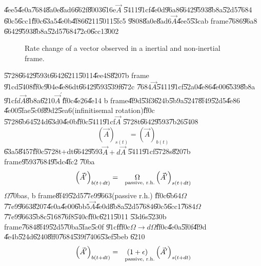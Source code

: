 \documentclass[12pt,a4paper]{article}
\begin{document}
\U{4ee5}\U{4e0a}\U{7684}\U{8a0e}\U{8ad6}\U{662f}\U{8003}\U{616e}$\vec{A}$%
\U{5411}\U{91cf}\U{4e0d}\U{96a8}\U{6642}\U{9593}\U{8b8a}\U{52d5}\U{7684}%
\U{60c5}\U{6cc1}\U{ff0c}\U{63a5}\U{4e0b}\U{4f86}\U{6211}\U{5011}\U{5fc5}%
\U{9808}\U{8a0e}\U{8ad6}$\vec{A}$\U{4ee5}\U{53ca}b frame\U{7686}\U{96a8}%
\U{6642}\U{9593}\U{8b8a}\U{52d5}\U{7684}\U{72c0}\U{6cc1}\U{3002}

\begin{figure}[th]
\caption{Rate change of a vector observed in a inertial and non-inertial
frame.}
\label{ratevecfig}
\begin{center}
\fbox{}
\end{center}
\end{figure}

\U{5728}\U{6642}\U{9593}t\U{6642}\U{6211}\U{5011}\U{4ee4}S\U{8207}b frame%
\U{91cd}\U{5408}\U{ff0c}\U{904e}\U{4e86}dt\U{6642}\U{9593}\U{539f}\U{672c}%
\U{7684}$\vec{A}$\U{5411}\U{91cf}\U{52a0}\U{4e86}\U{4e00}\U{6539}\U{8b8a}%
\U{91cf}$d\vec{A}$\U{8b8a}\U{6210}$\vec{A}^{\prime }$\U{ff0c}\U{4e26}\U{4e14}%
b frame\U{4f9d}\U{53f3}\U{624b}\U{5b9a}\U{5247}\U{8f49}\U{52d5}\U{4e86}%
\U{4e00}\U{5fae}\U{5c0f}\U{89d2}\U{5ea6}(infinitisemal rotation)\U{ff0c}%
\U{5728}\U{6b64}\U{524d}\U{63d0}\U{4e0b}\U{ff0c}\U{5411}\U{91cf}$\vec{A}$%
\U{5728}t\U{6642}\U{9593}\U{7b26}\U{5408}%
\begin{equation}
\left( \vec{A}\right) _{s(t)}=\left( \vec{A}\right) _{b(t)}  \label{roc1}
\end{equation}%
\U{63a5}\U{8457}\U{ff0c}\U{5728}t+dt\U{6642}\U{9593}$\vec{A}+d\vec{A}$%
\U{5411}\U{91cf}\U{5728}s\U{8207}b frame\U{9593}\U{7684}\U{95dc}\U{4fc2}%
\U{70ba}%
\begin{equation}
\left( \vec{A}^{\prime }\right) _{b(t+dt)}=\underset{\text{passive, r.h.}}{%
\Omega }\left( \vec{A}^{\prime }\right) _{s(t+dt)}  \label{roc1dt}
\end{equation}%
$\Omega $\U{70ba}s, b frame\U{8f49}\U{52d5}\U{77e9}\U{9663}(passive r.h.)%
\U{ff0c}\U{6b64}$\Omega $\U{77e9}\U{9663}\U{8207}\U{4e0a}\U{4e00}\U{6bb5}$%
\vec{A}$\U{4e0d}\U{8b8a}\U{52d5}\U{7684}\U{60c5}\U{6cc1}\U{7684}$\Omega $%
\U{77e9}\U{9663}\U{5b8c}\U{5168}\U{76f8}\U{540c}\U{ff0c}\U{6211}\U{5011}%
\U{53d6}s\U{5230}b frame\U{7684}\U{8f49}\U{52d5}\U{70ba}\U{5fae}\U{5c0f}%
\U{91cf}\U{ff0c}$\Omega \rightarrow d\Omega $\U{ff0c}\U{4e0a}\U{5f0f}\U{4f9d}%
\U{4e4b}\U{524d}\U{6240}\U{8ff0}\U{7684}\U{539f}\U{7406}\U{53ef}\U{5beb}%
\U{6210}%
\begin{equation*}
\left( \vec{A}^{\prime }\right) _{b(t+dt)}=\underset{\text{passive, r.h.}}{%
\left( 1+\epsilon \right) }\left( \vec{A}^{\prime }\right) _{s(t+dt)}
\end{equation*}%
\end{document}
